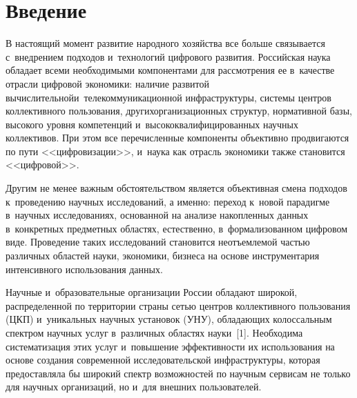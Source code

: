   



\thispagestyle{headings}

\begin{multicols}{2}

\label{st\stat}


\section{Введение}
     
     В настоящий момент развитие народного хозяйства все больше 
связывается с~внедрением подходов и~технологий цифрового развития. 
Российская наука обладает всеми необходимыми компонентами для 
рассмотрения ее в~качестве отрасли цифровой экономики: наличие развитой 
вычислительной\linebreak и~телекоммуникационной инфраструктуры, системы 
центров коллективного пользования, других\linebreak организа\-ционных структур, 
нормативной базы, высокого уровня компетенций 
и~высококвалифицированных научных коллективов. При этом все 
перечисленные компоненты объективно продвигаются по пути 
<<цифровизации>>, и~наука как отрасль экономики также становится 
<<цифровой>>.
     
     Другим не менее важным обстоятельством является объективная смена 
подходов к~проведению научных исследований, а именно: переход к~новой 
парадигме в~научных исследованиях, основанной на анализе накопленных 
данных в~конкретных предметных областях, естественно, в~формализованном 
цифровом виде. Проведение таких исследований становится неотъемлемой 
частью различных областей науки, экономики, бизнеса на основе 
инструментария интенсивного использования данных. 
     
     Научные и~образовательные организации России обладают широкой, 
распределенной по территории страны сетью центров коллективного 
пользования (ЦКП) и~уникальных научных установок (УНУ), обладающих колоссальным 
спектром научных услуг в~различных областях науки~[1]. Необходима 
систематизация этих услуг и~повышение эффективности их использования на 
основе создания современной исследовательской инфраструктуры, которая 
предо\-став\-ля\-ла бы широкий спектр возможностей по научным сервисам не 
только для научных организаций, но и~для внешних пользователей. 
     

\end{multicols}
